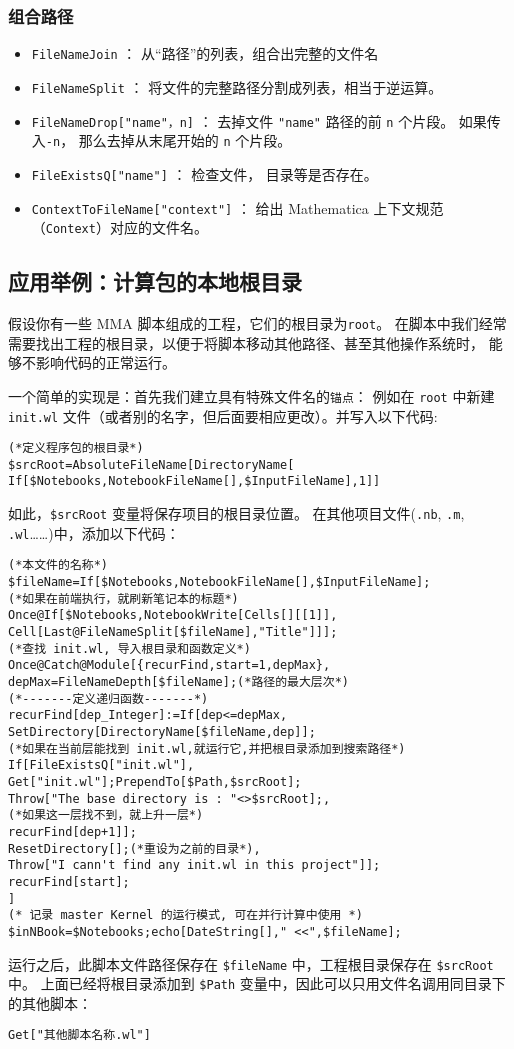 \subsubsection{组合路径}

\begin{itemize}
\item \verb`FileNameJoin` ： 从“路径”的列表，组合出完整的文件名
\item \verb`FileNameSplit` ： 将文件的完整路径分割成列表，相当于逆运算。
\item \verb`FileNameDrop["name"，n]` ： 去掉文件 \verb`"name"` 路径的前 \verb`n` 个片段。 
如果传入\verb`-n`， 那么去掉从末尾开始的 \verb`n` 个片段。
\item \verb`FileExistsQ["name"]`  ： 检查文件， 目录等是否存在。
\item \verb`ContextToFileName["context"]`  ： 给出 Mathematica 上下文规范（\verb`Context`）对应的文件名。
\end{itemize}

\subsection{应用举例：计算包的本地根目录}

假设你有一些 MMA 脚本组成的工程，它们的根目录为\verb`root`。
在脚本中我们经常需要找出工程的根目录，以便于将脚本移动其他路径、甚至其他操作系统时，
能够不影响代码的正常运行。

一个简单的实现是：首先我们建立具有特殊文件名的\verb`锚点`：
例如在 \verb`root` 中新建 \verb`init.wl` 文件（或者别的名字，但后面要相应更改）。并写入以下代码:
\begin{lstlisting}[language=mma]
(*定义程序包的根目录*)
$srcRoot=AbsoluteFileName[DirectoryName[
If[$Notebooks,NotebookFileName[],$InputFileName],1]]
\end{lstlisting}
如此，\verb`$srcRoot` 变量将保存项目的根目录位置。
在其他项目文件(\verb`.nb`, \verb`.m`, \verb`.wl`……)中，添加以下代码：
\begin{lstlisting}[language=mma]
(*本文件的名称*)
$fileName=If[$Notebooks,NotebookFileName[],$InputFileName];
(*如果在前端执行，就刷新笔记本的标题*)
Once@If[$Notebooks,NotebookWrite[Cells[][[1]],
Cell[Last@FileNameSplit[$fileName],"Title"]]];
(*查找 init.wl, 导入根目录和函数定义*)
Once@Catch@Module[{recurFind,start=1,depMax},
depMax=FileNameDepth[$fileName];(*路径的最大层次*)
(*-------定义递归函数-------*)
recurFind[dep_Integer]:=If[dep<=depMax,
SetDirectory[DirectoryName[$fileName,dep]];
(*如果在当前层能找到 init.wl,就运行它,并把根目录添加到搜索路径*)
If[FileExistsQ["init.wl"],
Get["init.wl"];PrependTo[$Path,$srcRoot];
Throw["The base directory is : "<>$srcRoot];,
(*如果这一层找不到，就上升一层*)
recurFind[dep+1]];
ResetDirectory[];(*重设为之前的目录*),
Throw["I cann't find any init.wl in this project"]];
recurFind[start];
]
(* 记录 master Kernel 的运行模式, 可在并行计算中使用 *)
$inNBook=$Notebooks;echo[DateString[]," <<",$fileName];
\end{lstlisting}
运行之后，此脚本文件路径保存在 \verb`$fileName` 中，工程根目录保存在 \verb`$srcRoot` 中。
上面已经将根目录添加到 \verb`$Path` 变量中，因此可以只用文件名调用同目录下的其他脚本：
\begin{lstlisting}[language=mma]
Get["其他脚本名称.wl"]
\end{lstlisting}
